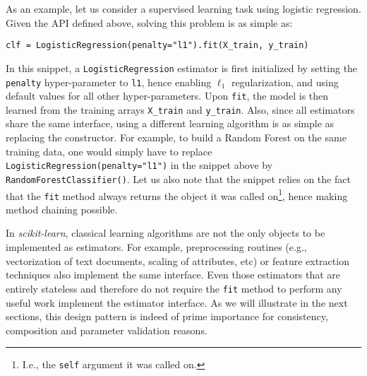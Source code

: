 \documentclass{llncs}
\begin{document}

As an example, let us consider a supervised learning task using logistic regression.
Given the API defined above, solving this problem is as simple as:
\begin{center}
\texttt{clf = LogisticRegression(penalty="l1").fit(X\_train, y\_train)}
\end{center}
In this snippet, a \texttt{LogisticRegression} estimator is first initialized by
setting the \texttt{penalty} hyper-parameter to \texttt{l1}, hence
enabling $\ell_1$
regularization, and using default values for all other hyper-parameters. Upon
\texttt{fit}, the model is then learned from the training arrays \texttt{X\_train} and
\texttt{y\_train}. Also, since all estimators share the same interface, using a
different learning algorithm is as simple as replacing the constructor. For
example, to build a Random Forest on the same training data, one would simply
have to replace \texttt{LogisticRegression(penalty="l1")} in the snippet above by
\texttt{RandomForestClassifier()}. Let us also note that the snippet relies on the
fact that the \texttt{fit} method always returns the object it was called
on\footnote{I.e., the \texttt{self} argument it was called on.}, hence making
method chaining  possible.

In \textit{scikit-learn}, classical learning algorithms are not the only objects
to be implemented as estimators. For example, preprocessing routines (e.g.,
vectorization of text documents, scaling of attributes, etc) or feature
extraction techniques also implement the same interface. Even those estimators
that are entirely stateless and therefore do not require the \texttt{fit} method
to perform any useful work implement the estimator interface. As we will
illustrate in the next sections, this design pattern is indeed of prime
importance for consistency, composition and parameter validation reasons.
\end{document}
